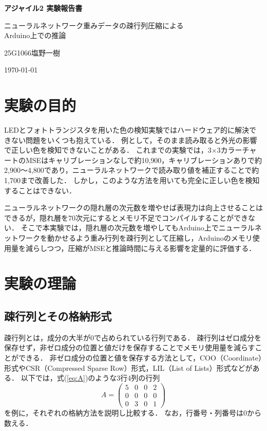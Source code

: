 \documentclass[a4paper,11pt,uplatex,dvipdfmx]{jsarticle}
\begin{document}
\begin{titlepage}
  \centering
  \vspace*{50mm}
  {\Huge\bfseries アジャイル2 実験報告書\par}
  \vspace{15mm}
  {\Large ニューラルネットワーク重みデータの疎行列圧縮による\\[0.5em]Arduino上での推論\par}
  \vfill
  {\Large 25G1066\quad 塩野一樹\par}
  \vspace{8mm}
  {\large \today\par}
  \vspace{40mm}
\end{titlepage}

\section{実験の目的}
LEDとフォトトランジスタを用いた色の検知実験ではハードウェア的に解決できない問題をいくつも抱えている．
例として，そのまま読み取ると外光の影響で正しい色を検知できないことがある．
これまでの実験では，3$\times$3カラーチャートのMSEはキャリブレーションなしで約10{,}900，キャリブレーションありで約2{,}900〜4{,}800であり，ニューラルネットワークで読み取り値を補正することで約1{,}700まで改善した．
しかし，このような方法を用いても完全に正しい色を検知することはできない．

ニューラルネットワークの隠れ層の次元数を増やせば表現力は向上させることはできるが，隠れ層を70次元にするとメモリ不足でコンパイルすることができない．
そこで本実験では，隠れ層の次元数を増やしてもArduino上でニューラルネットワークを動かせるよう重み行列を疎行列として圧縮し，Arduinoのメモリ使用量を減らしつつ，圧縮がMSEと推論時間に与える影響を定量的に評価する．

\section{実験の理論}
\subsection{疎行列とその格納形式}
疎行列とは，成分の大半が0で占められている行列である．
疎行列はゼロ成分を保存せず，非ゼロ成分の位置と値だけを保存することでメモリ使用量を減らすことができる．
非ゼロ成分の位置と値を保存する方法として，COO（Coordinate）形式やCSR（Compressed Sparse Row）形式，LIL（List of Lists）形式などがある．
以下では，式(\ref{eq:A})のような3行4列の行列
\begin{equation}
  \label{eq:A}
  A =
  \begin{pmatrix}
    5 & 0 & 0 & 2 \\
    0 & 0 & 0 & 0 \\
    0 & 3 & 0 & 1
  \end{pmatrix}
\end{equation}
を例に，それぞれの格納方法を説明し比較する．
なお，行番号・列番号は0から数える．
\end{document}
